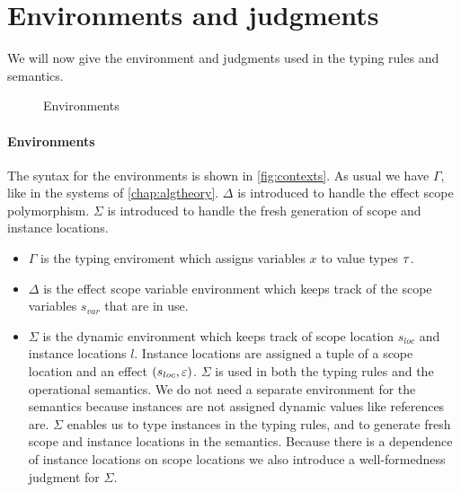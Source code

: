 {\section{Environments and judgments}
\label{sec:contexts}
We will now give the environment and judgments used in the typing rules and semantics.

\begin{figure}[h]
\caption{Environments}
\centering
{}
\end{figure}

\paragraph{Environments}
The syntax for the environments is shown in \cref{fig:contexts}.
As usual we have $\Gamma$, like in the systems of \cref{chap:algtheory}.
$\Delta$ is introduced to handle the effect scope polymorphism.
$\Sigma$ is introduced to handle the fresh generation of scope and instance locations.

\begin{itemize}
\item $\Gamma$ is the typing enviroment which assigns variables $x$ to value types $\tau$.
\item $\Delta$ is the effect scope variable environment which keeps track of the scope variables $s_{var}$ that are in use.
\item $\Sigma$ is the dynamic environment which keeps track of scope location $s_{loc}$ and instance locations $l$. Instance locations are assigned a tuple of a scope location and an effect $(s_{loc}, \varepsilon)$. $\Sigma$ is used in both the typing rules and the operational semantics.
We do not need a separate environment for the semantics because instances are not assigned dynamic values like references are.
$\Sigma$ enables us to type instances in the typing rules, and to generate fresh scope and instance locations in the semantics.
Because there is a dependence of instance locations on scope locations we also introduce a well-formedness judgment for $\Sigma$.
\end{itemize}

}
